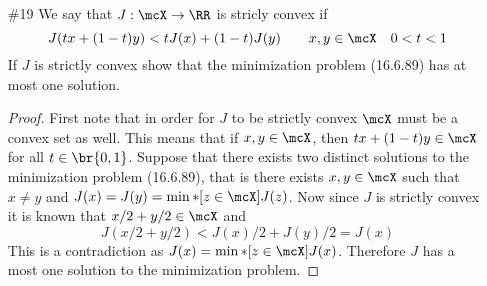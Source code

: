\documentclass[11pt, oneside]{article}
\begin{document}
\begin{enumerate}
  \pagebreak
  \item[\#19] %
    We say that $J: \mcX \to \RR$ is stricly convex if
    \[
      J(tx + (1 - t)y) < tJ(x) + (1 - t)J(y) \qquad x, y \in \mcX \quad 0 < t < 1
    \]
    If $J$ is strictly convex show that the minimization problem (16.6.89) has
    at most one solution.

    \begin{proof}
      First note that in order for $J$ to be strictly convex $\mcX$ must be a
      convex set as well.
      This means that if $x, y \in \mcX$, then $tx + (1 - t)y \in \mcX$ for all
      $t \in \br{0, 1}$.
      Suppose that there exists two distinct solutions to the minimization
      problem (16.6.89), that is there exists $x, y \in \mcX$ such that
      $x \neq y$ and $J(x) = J(y) = \min*[z \in \mcX]{J(z)}$.
      Now since $J$ is strictly convex it is known that $x/2 + y/2 \in \mcX$ and
      \[
        J(x/2 + y/2) < J(x)/2 + J(y)/2 = J(x)
      \]
      This is a contradiction as $J(x) = \min*[z \in \mcX]{J(x)}$.
      Therefore $J$ has a most one solution to the minimization problem.
    \end{proof}
\end{enumerate}
\end{document}
